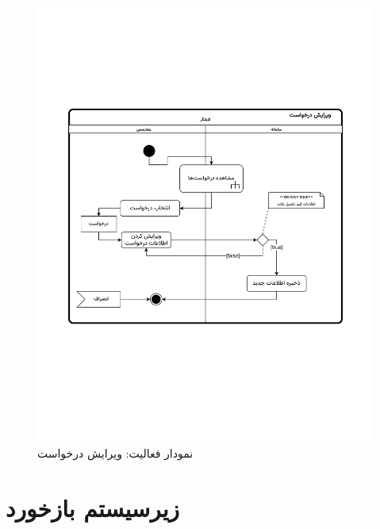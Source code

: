 \begin{figure}[ht!]
	\centering
	\includegraphics[scale=0.8, page=1]{figs/OOD-activity-editreq.pdf}
	\caption{نمودار فعالیت: ویرایش درخواست}
\end{figure}
\FloatBarrier
\newpage


\section{زیرسیستم بازخورد}


